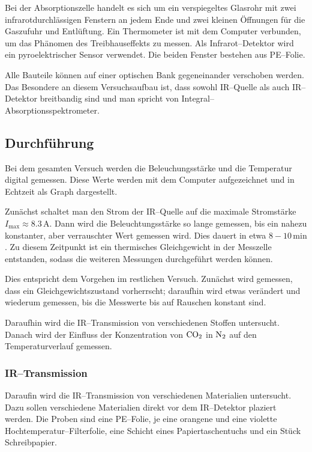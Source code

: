 \documentclass[12pt,a4paper]{scrartcl}
\numberwithin{equation}{section} %
\begin{document}
Bei der Absorptionszelle handelt es sich um ein verspiegeltes Glasrohr mit zwei infrarotdurchlässigen Fenstern an jedem Ende und zwei kleinen Öffnungen für die Gaszufuhr und Entlüftung. Ein Thermometer ist mit dem Computer verbunden, um das Phänomen des Treibhauseffekts zu messen. Als Infrarot--Detektor wird ein pyroelektrischer Sensor verwendet. Die beiden Fenster bestehen aus PE--Folie.

Alle Bauteile können auf einer optischen Bank gegeneinander verschoben werden. Das Besondere an diesem Versuchsaufbau ist, dass sowohl IR--Quelle als auch IR--Detektor breitbandig sind und man spricht von Integral--Absorptionsspektrometer.

\subsection{Durchführung}
\label{durchfuehrung}
Bei dem gesamten Versuch werden die Beleuchungsstärke und die Temperatur digital gemessen. Diese Werte werden mit dem Computer aufgezeichnet und in Echtzeit als Graph dargestellt.

Zunächst schaltet man den Strom der IR--Quelle auf die maximale Stromstärke $I_\mathrm{max}\approx 8.3\mathrm{\,A}$. Dann wird die Beleuchtungsstärke so lange gemessen, bis ein nahezu konstanter, aber verrauschter Wert gemessen wird. Dies dauert in etwa $8-10\mathrm{\,min}$. Zu diesem Zeitpunkt ist ein thermisches Gleichgewicht in der Messzelle entstanden, sodass die weiteren Messungen durchgeführt werden können.

Dies entspricht dem Vorgehen im restlichen Versuch. Zunächst wird gemessen, dass ein Gleichgewichtszustand vorherrscht; daraufhin wird etwas verändert und wiederum gemessen, bis die Messwerte bis auf Rauschen konstant sind.

Daraufhin wird die IR--Transmission von verschiedenen Stoffen untersucht. Danach wird der Einfluss der Konzentration von $\ce{CO_2}$ in $\ce{N_2}$ auf den Temperaturverlauf gemessen.

\subsubsection{IR--Transmission}
\label{howto:IR--Transmission}

Daraufin wird die IR--Transmission von verschiedenen Materialien untersucht. Dazu sollen verschiedene Materialien direkt vor dem IR--Detektor plaziert werden. Die Proben sind eine PE--Folie, je eine orangene und eine violette Hochtemperatur--Filterfolie, eine Schicht eines Papiertaschentuchs und ein Stück Schreibpapier.
\end{document}
